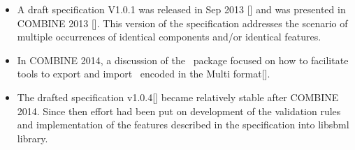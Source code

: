 \begin{itemize}
 
 \item A draft specification V1.0.1 was released in Sep 2013 [\cite{ref:multispecV101}] and was presented in COMBINE 2013 [\cite{ref:combine2013}]. This version of the specification addresses the scenario of multiple occurrences of identical components and/or identical features.
 
 \item In COMBINE 2014, a discussion of the \multi\ package focused on how to facilitate tools to export and import \smodels\ encoded in the Multi format[\cite{ref:combine2014}].
 
 \item The drafted specification v1.0.4[\cite{ref:multispecV104}] became relatively stable after COMBINE 2014. Since then effort had been put on development of the validation rules and implementation of the features described in the specification into libsbml library. 
 
\end{itemize}

\clearpage

